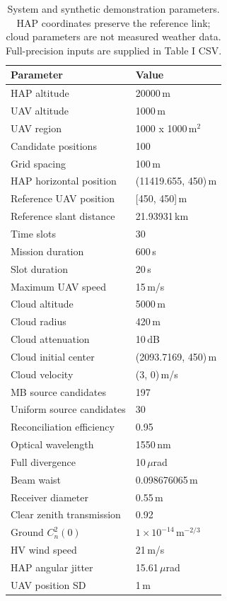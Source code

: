 \begin{table}[t]
\caption{System and synthetic demonstration parameters. HAP coordinates preserve the reference link; cloud parameters are not measured weather data. Full-precision inputs are supplied in Table I CSV.}
\label{tab:mobility_system}
\centering\scriptsize
\begin{tabular}{@{}p{}p{}@{}}\hline
Parameter & Value \\ \hline
HAP altitude & 20000\,m \\
UAV altitude & 1000\,m \\
UAV region & 1000 x 1000\,$\mathrm{m}^2$ \\
Candidate positions & 100 \\
Grid spacing & 100\,m \\
HAP horizontal position & (11419.655, 450)\,m \\
Reference UAV position & [450, 450]\,m \\
Reference slant distance & 21.93931\,km \\
Time slots & 30 \\
Mission duration & 600\,s \\
Slot duration & 20\,s \\
Maximum UAV speed & 15\,m/s \\
Cloud altitude & 5000\,m \\
Cloud radius & 420\,m \\
Cloud attenuation & 10\,dB \\
Cloud initial center & (2093.7169, 450)\,m \\
Cloud velocity & (3, 0)\,m/s \\
MB source candidates & 197 \\
Uniform source candidates & 30 \\
Reconciliation efficiency & 0.95 \\
Optical wavelength & 1550\,nm \\
Full divergence & 10\,$\mu$rad \\
Beam waist & 0.098676065\,m \\
Receiver diameter & 0.55\,m \\
Clear zenith transmission & 0.92 \\
Ground $C_n^2(0)$ & $1\times10^{-14}$\,$\mathrm{m}^{-2/3}$ \\
HV wind speed & 21\,m/s \\
HAP angular jitter & 15.61\,$\mu$rad \\
UAV position SD & 1\,m \\

\end{tabular}
\end{table}
